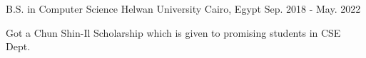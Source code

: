 

\begin{cventries}

  \cventry
    {B.S. in Computer Science} %
    {Helwan University} %
    {Cairo, Egypt} %
    {Sep. 2018 - May. 2022} %
    {
      \begin{cvitems} %
        \item {Got a Chun Shin-Il Scholarship which is given to promising students in CSE Dept.}
      \end{cvitems}
    }

\end{cventries}
